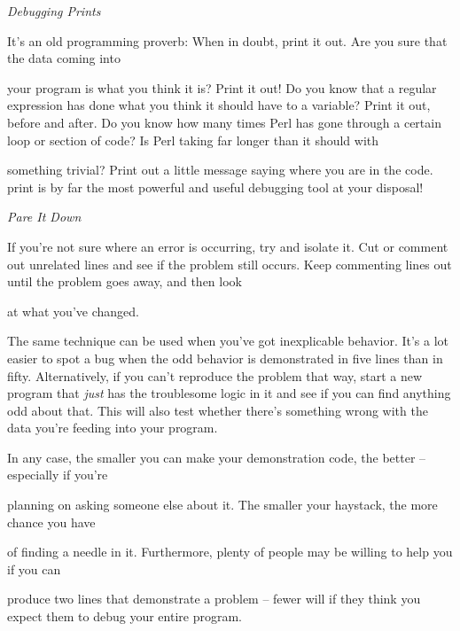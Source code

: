 \documentclass[a4paper,11pt]{book}
\begin{document}
\noindent 

\noindent \textit{Debugging Prints}

\noindent It's an old programming proverb: When in doubt, print it out. Are you sure that the data coming into

\noindent your program is what you think it is? Print it out! Do you know that a regular expression has done what you think it should have to a variable? Print it out, before and after. Do you know how many times Perl has gone through a certain loop or section of code? Is Perl taking far longer than it should with

\noindent something trivial? Print out a little message saying where you are in the code. print is by far the most powerful and useful debugging tool at your disposal!

\noindent 

\noindent \textit{Pare It Down}

\noindent If you're not sure where an error is occurring, try and isolate it. Cut or comment out unrelated lines and see if the problem still occurs. Keep commenting lines out until the problem goes away, and then look

\noindent at what you've changed.

\noindent 

\noindent The same technique can be used when you've got inexplicable behavior. It's a lot easier to spot a bug when the odd behavior is demonstrated in five lines than in fifty. Alternatively, if you can't reproduce the problem that way, start a new program that \textit{just }has the troublesome logic in it and see if you can find anything odd about that. This will also test whether there's something wrong with the data you're feeding into your program.

\noindent 

\noindent 

\noindent In  any  case,  the smaller you  can  make  your  demonstration  code,  the  better  --  especially  if  you're

\noindent planning on asking  someone else  about  it.  The  smaller  your  haystack,  the  more  chance  you  have

\noindent of finding  a needle  in it.  Furthermore,  plenty  of people  may  be  willing  to  help  you  if  you  can

\noindent produce two  lines that  demonstrate  a  problem  --  fewer  will  if  they think  you  expect  them  to  debug your entire program.
\end{document}
